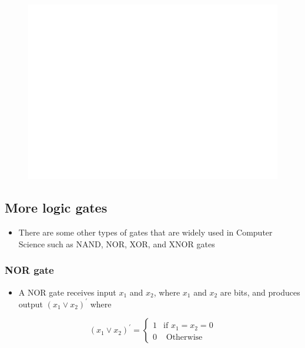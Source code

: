 \documentclass[]{book}
\providecommand{\tightlist}{%
  \setlength{\itemsep}{0pt}\setlength{\parskip}{0pt}}
\begin{document}
\begin{figure}

{\centering \includegraphics[width=1\linewidth]{figure/boxC43-1} 

}

\end{figure}

\hypertarget{more-logic-gates}{%
\subsection{More logic gates}\label{more-logic-gates}}

\begin{itemize}
\tightlist
\item
  There are some other types of gates that are widely used in Computer Science such as NAND, NOR, XOR, and XNOR gates
\end{itemize}

\hypertarget{nor-gate}{%
\subsubsection{NOR gate}\label{nor-gate}}

\begin{itemize}
\tightlist
\item
  A NOR gate receives input \(x_1\) and \(x_2\), where \(x_1\) and \(x_2\) are bits, and produces output \((x_1 \lor x_2)^\prime\) where
\end{itemize}

\begin{equation}
(x_1 \lor x_2)^\prime =
\begin{cases} 
1 & \text{if } x_1 = x_2=0\\
0 & \text{ Otherwise }
\end{cases}
\end{equation}
\end{document}
